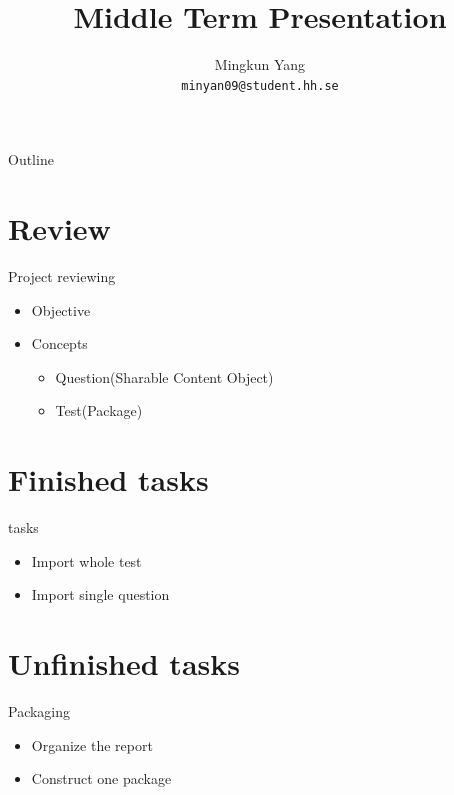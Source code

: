 \documentclass{beamer}
\title{Middle Term Presentation}
\author{Mingkun Yang \\
\texttt{minyan09@student.hh.se}}
\institute{
Halmstad University\\
}
\date{}
\begin{document}
\begin{frame}
	\titlepage
\end{frame}

\begin{frame}{Outline}
	\tableofcontents[pausesections]
\end{frame}

\section{Review}
\begin{frame}{Project reviewing}
	\begin{itemize}
		\item
			Objective
			\pause
		\item
			Concepts
			\begin{itemize}
				\item
					Question(Sharable Content Object)
					\pause
				\item
					Test(Package)
			\end{itemize}
	\end{itemize}

\end{frame}

\section{Finished tasks}
\begin{frame}{tasks}
	\begin{itemize}
		\item
			Import whole test
			\pause
		\item
			Import single question
	\end{itemize}
\end{frame}

\section{Unfinished tasks}
\begin{frame}{Packaging}
	\begin{itemize}
		\item
			Organize the report
			\pause
		\item
			Construct one package
	\end{itemize}
\end{frame}
\end{document}
